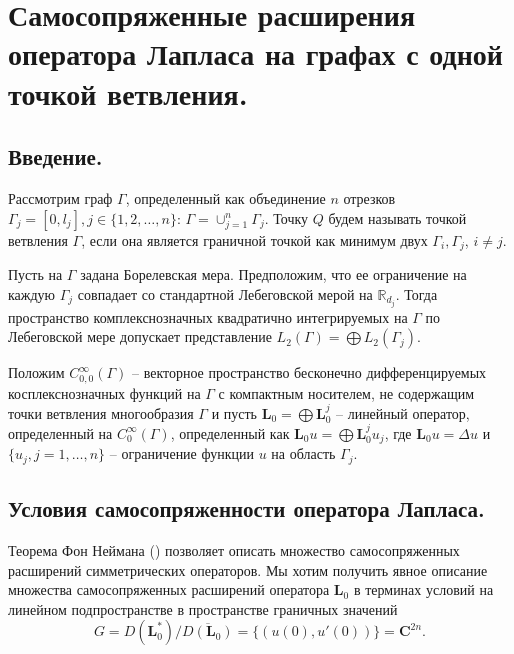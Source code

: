 \chapter{Самосопряженные расширения оператора Лапласа на графах с одной точкой ветвления.}\label{ch:ch4}

\section{Введение.}\label{sec:ch4/sect1}
Рассмотрим граф $\Gamma$, определенный как объединение $n$ отрезков $\Gamma_j=[0,l_j], j \in \{1, 2, \ldots, n\}$: $\Gamma = \cup_{j=1}^n \Gamma_j$. Точку $Q$ будем называть точкой ветвления  $\Gamma$, если она является граничной точкой как минимум двух  $\Gamma_i, \Gamma_j$, $i \neq j$.

Пусть на $\Gamma$ задана Борелевская мера. Предположим, что ее ограничение на каждую  $\Gamma_j$ совпадает со стандартной Лебеговской мерой на $\mathbb{R}_{d_j}$. Тогда пространство комплекснозначных квадратично интегрируемых на $\Gamma$ по Лебеговской мере допускает представление $L_2(\Gamma) = \bigoplus L_2(\Gamma_j)$.

Положим $C_{0,0}^\infty(\Gamma)$ -- векторное пространство бесконечно дифференцируемых косплекснозначных функций на $\Gamma$ с компактным носителем, не содержащим точки ветвления многообразия $\Gamma$ и пусть $\textbf{L}_0 = \bigoplus \textbf{L}_0^j$ -- линейный оператор, определенный на $C_0^\infty(\Gamma)$, определенный как $\textbf{L}_0 u = \bigoplus \textbf{L}_0^j u_j $, где  $\textbf{L}_0 u = \Delta u$  и $\{u_j, j=1,\ldots, n\}$ -- ограничение функции $u$ на область $\Gamma_j$.

\section{Условия самосопряженности оператора Лапласа.}\label{sec:ch4/sect2}
Теорема Фон Неймана  (\cite{reed1980methods, kato2013perturbation}) позволяет описать множество самосопряженных расширений симметрических операторов. Мы хотим получить явное описание множества самосопряженных расширений оператора $\textbf{L}_0$ в терминах условий на линейном подпространстве в пространстве граничных значений
$$G = D(\textbf{L}_0^*) / \overline{D(\textbf{L}_0)} = \{ (u(0), u'(0) ) \}  =\mathbf{C}^{2n}.$$

